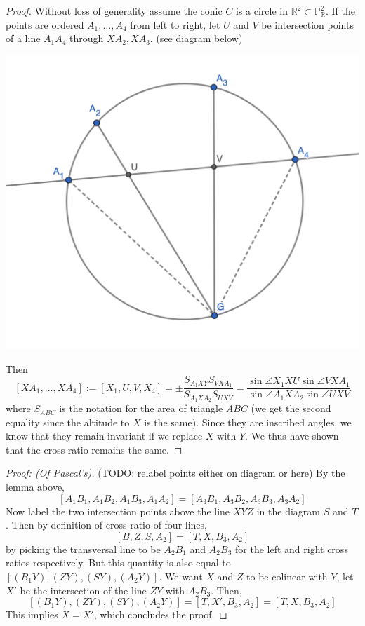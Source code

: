 \documentclass[12pt]{article}
\newcommand{\R}{\mathbb{R}}
\renewcommand{\P}{\mathbb{P}}
\begin{document}
    \begin{proof}
        Without loss of generality assume the conic $C$ is a circle in $\R^2 \subset \P_\R^2$. If the points are ordered $A_1, \dots, A_4$ from left to right, let $U$ and $V$ be intersection points of a line $A_1A_4$ through $XA_2, XA_3$. (see diagram below)
        \begin{center}
            \includegraphics[width = 0.6\linewidth]{chasles.png}
        \end{center}
        Then
        $$[XA_1, \dots, XA_4] := [X_1, U, V, X_4] = \pm \frac{S_{A_1XY} S_{VXA_1}}{S_{A_1XA_2}S_{UXV}} = \frac{\sin \angle X_1XU \sin \angle VXA_1}{\sin \angle A_1XA_2 \sin \angle UXV}$$
        where $S_{ABC}$ is the notation for the area of triangle $ABC$ (we get the second equality since the altitude to $X$ is the same). Since they are inscribed angles, we know that they remain invariant if we replace $X$ with $Y$. We thus have shown that the cross ratio remains the same.
    \end{proof}
    \begin{proof}
        [Proof: (Of Pascal's)] (TODO: relabel points either on diagram or here) By the lemma above,
        $$[A_1B_1, A_1B_2, A_1B_3, A_1A_2] = [A_3B_1, A_3B_2, A_3B_3, A_3A_2]$$
        Now label the two intersection points above the line $XYZ$ in the diagram $S$ and $T$. Then by definition of cross ratio of four lines,
        $$[B, Z, S, A_2] = [T, X, B_3, A_2]$$
        by picking the transversal line to be $A_2B_1$ and $A_2B_3$ for the left and right cross ratios respectively. But this quantity is also equal to $[(B_1Y), (ZY), (SY), (A_2Y)]$. We want $X$ and $Z$ to be colinear with $Y$, let $X'$ be the intersection of the line $ZY$ with $A_2B_3$. Then,
        $$[(B_1Y), (ZY), (SY), (A_2Y)] = [T, X', B_3, A_2] = [T, X, B_3, A_2]$$
        This implies $X = X'$, which concludes the proof.
    \end{proof}
\end{document}
